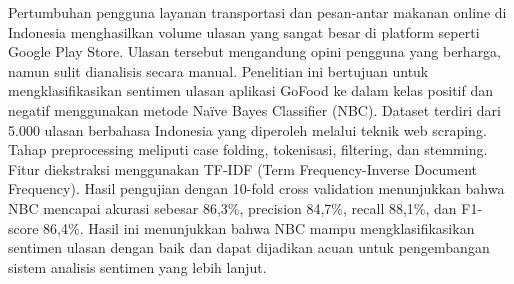 
\noindent Pertumbuhan pengguna layanan transportasi dan pesan-antar makanan online di Indonesia menghasilkan volume ulasan yang sangat besar di platform seperti Google Play Store. Ulasan tersebut mengandung opini pengguna yang berharga, namun sulit dianalisis secara manual. Penelitian ini bertujuan untuk mengklasifikasikan sentimen ulasan aplikasi GoFood ke dalam kelas positif dan negatif menggunakan metode Na\"ive Bayes Classifier (NBC). Dataset terdiri dari 5.000 ulasan berbahasa Indonesia yang diperoleh melalui teknik web scraping. Tahap preprocessing meliputi case folding, tokenisasi, filtering, dan stemming. Fitur diekstraksi menggunakan TF-IDF (Term Frequency-Inverse Document Frequency). Hasil pengujian dengan 10-fold cross validation menunjukkan bahwa NBC mencapai akurasi sebesar 86,3\%, precision 84,7\%, recall 88,1\%, dan F1-score 86,4\%. Hasil ini menunjukkan bahwa NBC mampu mengklasifikasikan sentimen ulasan dengan baik dan dapat dijadikan acuan untuk pengembangan sistem analisis sentimen yang lebih lanjut.